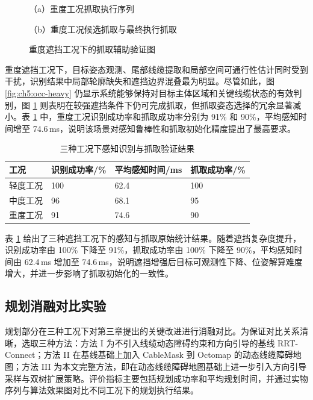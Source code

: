 \begin{figure}[htbp]
  \centering
  \begin{minipage}[t]{0.48\textwidth}
    \centering
    
    {\small （a）重度工况抓取执行序列}
  \end{minipage}
  \hfill
  \begin{minipage}[t]{0.48\textwidth}
    \centering
    
    {\small （b）重度工况候选抓取与最终执行抓取}
  \end{minipage}
  \caption{重度遮挡工况下的抓取辅助验证图}
  \label{fig:ch5:grasp-heavy}
\end{figure}

\noindent
重度遮挡工况下，目标姿态观测、尾部线缆提取和局部空间可通行性估计同时受到干扰，识别结果中局部轮廓缺失和遮挡边界混叠最为明显。尽管如此，图 \ref{fig:ch5:occ-heavy} 仍显示系统能够保持对目标主体区域和关键线缆状态的有效判别，图 \ref{fig:ch5:grasp-heavy} 则表明在较强遮挡条件下仍可完成抓取，但抓取姿态选择的冗余显著减小。表 \ref{tab:ch5:per-occlusion} 中，重度工况识别成功率和抓取成功率分别为 91\% 和 90\%，平均感知时间增至 74.6\,ms，说明该场景对感知鲁棒性和抓取初始化精度提出了最高要求。

\begin{table}[htbp]
  \centering
  \small
  \caption{三种工况下感知识别与抓取验证结果}
  \label{tab:ch5:per-occlusion}
  \begin{tabular}{|p{2.2cm}|p{2.5cm}|p{2.8cm}|p{2.4cm}|}
    \hline
    工况 & 识别成功率/\% & 平均感知时间/ms & 抓取成功率/\% \\
    \hline
    轻度工况 & 100 & 62.4 & 100 \\
    \hline
    中度工况 & 96 & 68.1 & 95 \\
    \hline
    重度工况 & 91 & 74.6 & 90 \\
    \hline
  \end{tabular}
\end{table}

表 \ref{tab:ch5:per-occlusion} 给出了三种遮挡工况下的感知与抓取原始统计结果。随着遮挡复杂度提升，识别成功率由 100\% 下降至 91\%，抓取成功率由 100\% 下降至 90\%，平均感知时间由 62.4\,ms 增加至 74.6\,ms，说明遮挡增强后目标可观测性下降、位姿解算难度增大，并进一步影响了抓取初始化的一致性。

\subsection{规划消融对比实验}
规划部分在三种工况下对第三章提出的关键改进进行消融对比。为保证对比关系清晰，选取三种方法：方法 I 为不引入线缆动态障碍约束和方向引导的基线 RRT-Connect；方法 II 在基线基础上加入 CableMask 到 Octomap 的动态线缆障碍地图；方法 III 为本文完整方法，即在动态线缆障碍地图基础上进一步引入方向引导采样与双树扩展策略。评价指标主要包括规划成功率和平均规划时间，并通过实物序列与算法效果图对比不同工况下的规划执行结果。

